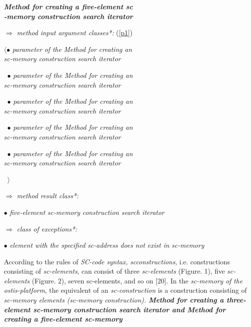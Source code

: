 \documentclass[10pt, twocolumn, a4paper]{article}
\begin{document}
\noindent \textbf{\textit{Method for creating a five-element sc\\-memory construction search iterator} }



\begin{level1}


\item[$\Rightarrow$] \textit{method input argument classes*:} (\ref{p1})
\begin{level1}

\item[ \textbf{$ \langle \bullet$}] \textit{parameter of the Method for creating an\\
sc-memory construction search iterator}
\item[ \, $ \bullet$] \textit{parameter of the Method for creating an\\
sc-memory construction search iterator}
\item[ \, $ \bullet$] \textit{parameter of the Method for creating an\\
sc-memory construction search iterator}
\item[ \, $ \bullet$] \textit{parameter of the Method for creating an\\
sc-memory construction search iterator}
\item[ \, $ \bullet$] \textit{parameter of the Method for creating an\\
sc-memory construction search iterator}
\item[ \, $\rangle$] 
 \end{level1}
\item[$\Rightarrow$] \textit{method result class*:}
\begin{level1}
\item[  $ \bullet$] \textit{five-element sc-memory construction search iterator}
\end{level1}
\item[$\Rightarrow$] \textit{class of exceptions*:}
\begin{level1}
\item[  $ \bullet$] \textit{element with the specified sc-address does
not exist in sc-memory}
\end{level1}

\vspace{11pt} 

According to the rules of\textit{ SC-code syntax, scconstructions}, i.e. constructions consisting of \textit{sc-elements},
can consist of three \textit{sc-elements} (Figure. 1), five \textit{sc-elements} (Figure. 2), seven sc-elements, and so on [20]. In
the \textit{sc-memory of the ostis-platform}, the equivalent of an
\textit{sc-construction} is a construction consisting of \textit{sc-memory
elements (sc-memory construction).\textbf{ Method for creating
a three-element sc-memory construction search iterator
\emph{\emph{and}} Method for creating a five-element sc-memory}}

\end{level1}
\end{document}
